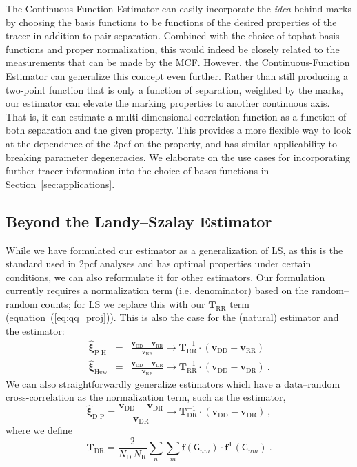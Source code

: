 \documentclass[modern]{aastex62}
\newcommand{\cf}{2pcf\xspace} %
\newcommand{\Est}{The Continuous-Function Estimator\xspace}
\newcommand{\est}{the Continuous-Function Estimator\xspace}
\newcommand{\LS}{LS\xspace}
\newcommand{\eqt}[1]{equation~(\ref{#1})}
\newcommand{\inv}{^{-1}}
\newcommand{\T}{^{\mathsf{T}}}
\newcommand{\bld}[1]{\bm{#1}} %
\newcommand{\vv}[1]{\bld{v}_\mathrm{#1}}
\newcommand{\TT}[1]{\bld{T}_\mathrm{#1}}
\newcommand{\ff}{\bld{f}}
\newcommand{\NN}[1]{N_\mathrm{#1}}
\newcommand{\GG}[1]{\mathsf{G}_{#1}}
\begin{document}
\Est can easily incorporate the \textit{idea} behind marks by choosing the basis functions to be functions of the desired properties of the tracer in addition to pair separation.
Combined with the choice of tophat basis functions and proper normalization, this would indeed be closely related to the measurements that can be made by the MCF.
However, \est can generalize this concept even further. 
Rather than still producing a two-point function that is only a function of separation, weighted by the marks, our estimator can elevate the marking properties to another continuous axis.
That is, it can estimate a multi-dimensional correlation function as a function of both separation and the given property.
This provides a more flexible way to look at the dependence of the \cf on the property, and has similar applicability to breaking parameter degeneracies.
We elaborate on the use cases for incorporating further tracer information into the choice of bases functions in Section~\ref{sec:applications}.


\subsection{Beyond the Landy--Szalay Estimator}
\label{sec:beyondls}

While we have formulated our estimator as a generalization of \LS, as this is the standard used in \cf analyses and has optimal properties under certain conditions, we can also reformulate it for other estimators.
Our formulation currently requires a normalization term (i.e. denominator) based on the random--random counts; for \LS we replace this with our $\TT{RR}$ term (\eqt{eq:qq_proj}).
This is also the case for the \cite{PeeblesHauser1974} (natural) estimator and the \cite{Hewett1982} estimator:
\begin{eqnarray}
    \bld{\hat{\xi}}_\text{P-H} &=& \frac{\vv{DD} - \vv{RR}}{\vv{RR}} \rightarrow \TT{RR}\inv \cdot \left( \vv{DD} - \vv{RR} \right)\\
    \bld{\hat{\xi}}_\text{Hew} &=& \frac{\vv{DD} - \vv{DR}}{\vv{RR}} \rightarrow \TT{RR}\inv \cdot \left( \vv{DD} - \vv{DR} \right) ~.
\end{eqnarray}
We can also straightforwardly generalize estimators which have a data--random cross-correlation as the normalization term, such as the \cite{DavisPeebles1983} estimator,
\begin{equation}
    \bld{\hat{\xi}}_\text{D-P} = \frac{\vv{DD} - \vv{DR}}{\vv{DR}} \rightarrow \TT{DR}\inv \cdot \left( \vv{DD} - \vv{DR} \right) ~,
\end{equation}
where we define
\begin{equation}
    \TT{DR} = \frac{2}{\NN{D}\,\NN{R}} \sum_{n} \sum_{m} \ff(\GG{n m}) \cdot \ff\T(\GG{n m}) ~.
\end{equation}
\end{document}

